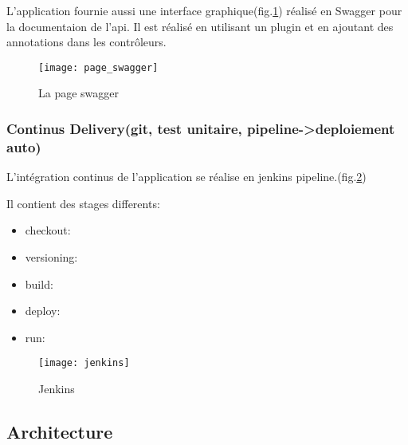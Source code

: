 L'application fournie aussi une interface graphique(fig.\ref{fig:page_swagger}) réalisé en Swagger pour la documentaion de l'api.
Il est réalisé en utilisant un plugin et en ajoutant des annotations dans les contrôleurs.

\begin{figure}[ht]
 \centering
 \texttt{[image: page\_swagger]}
 \caption{La page swagger}
 \label{fig:page_swagger}
\end{figure}

\clearpage

\subsubsection{Continus Delivery(git, test unitaire, pipeline->deploiement auto)}
L'intégration continus de l'application se réalise en jenkins pipeline.(fig.\ref{fig:jenkins})

Il contient des stages differents:
\begin{itemize}
 \item checkout:
 \item versioning:
 \item build:
 \item deploy:
 \item run:
\end{itemize}

\begin{figure}[ht]
 \centering
 \texttt{[image: jenkins]}
 \caption{Jenkins}
 \label{fig:jenkins}
\end{figure}

\clearpage

\subsection{Architecture}
